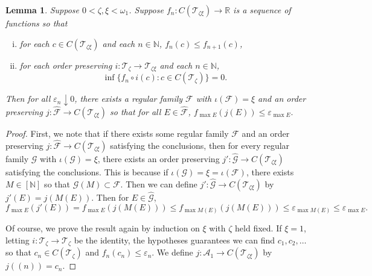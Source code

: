 \documentclass[12pt]{amsart}
\newtheorem{lemma}[theorem]{Lemma}
\theoremstyle{definition}
\newcommand{\infin}{[\mathbb{N}]}
\newcommand{\rr}{\mathbb{R}}
\newcommand{\nn}{\mathbb{N}}
\newcommand{\aaa}{\mathcal{A}}
\newcommand{\fff}{\mathcal{F}}
\newcommand{\gggg}{\mathcal{G}}
\newcommand{\ttt}{\mathcal{T}}
\begin{document}
\begin{lemma} Suppose $0<\zeta, \xi<\omega_1$.  Suppose $f_n:C(\ttt_{\zeta\xi})\to \rr$ is a sequence of functions so that \begin{enumerate}[(i)] \item for each $c\in C(\ttt_{\zeta\xi})$ and each $n\in \nn$, $f_n(c)\leqslant f_{n+1}(c)$, \item for each order preserving $i:\ttt_\zeta\to \ttt_{\zeta \xi}$ and each $n\in \nn$, $$\inf\{f_n\circ i(c): c\in C(\ttt_\zeta)\}=0.$$ \end{enumerate} Then for all $\varepsilon_n\downarrow 0$, there exists a regular family $\fff$ with $\iota(\fff)=\xi$ and an order preserving $j:\widehat{\fff}\to C(\ttt_{\zeta\xi})$ so that for all $E\in \widehat{\fff}$, $f_{\max E}(j(E)) \leqslant \varepsilon_{\max E}.$  

\label{mixed coloring}

\end{lemma} \begin{proof} First, we note that if there exists some regular family $\fff$ and an order preserving $j:\widehat{\fff}\to C(\ttt_{\zeta\xi})$ satisfying the conclusions, then for every regular family $\gggg$ with $\iota(\gggg)=\xi$, there exists an order preserving $j':\widehat{\gggg}\to C(\ttt_{\zeta\xi})$ satisfying the conclusions.  This is because if $\iota(\gggg)=\xi=\iota(\fff)$, there exists $M\in \infin$ so that $\gggg(M)\subset \fff$.  Then we can define $j':\widehat{\gggg}\to C(\ttt_{\zeta\xi})$ by $j'(E)= j(M(E))$.  Then for $E\in \widehat{\gggg}$, $$f_{\max E}(j'(E))= f_{\max E}(j(M(E)))\leqslant f_{\max M(E)} (j(M(E)))\leqslant \varepsilon_{\max M(E)}\leqslant \varepsilon_{\max E}.$$  

Of course, we prove the result again by induction on $\xi$ with $\zeta$ held fixed.  If $\xi= 1$, letting $i:\ttt_\zeta\to \ttt_\zeta$ be the identity, the hypotheses guarantees we can find $c_1, c_2, \ldots$ so that $c_n\in C(\ttt_{\zeta})$ and $f_n(c_n)\leqslant \varepsilon_n$.  We define $j:\aaa_1\to C(\ttt_{\zeta\xi})$ by $j((n))= c_n$.  


\end{proof}
\end{document}
